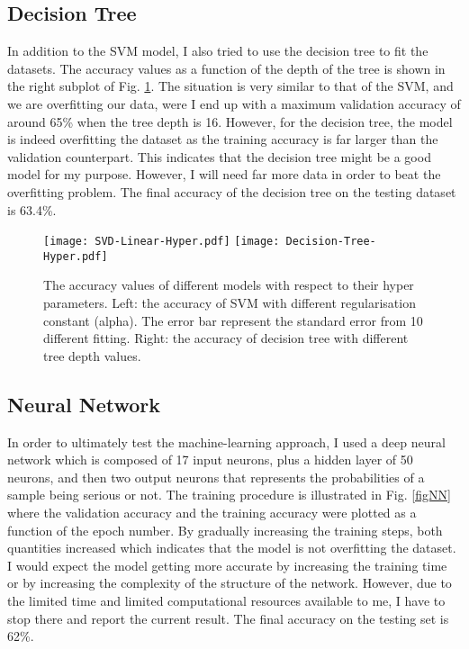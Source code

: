 \documentclass[12pt,a4paper]{article}
\begin{document}
\subsection{Decision Tree}

In addition to the SVM model, I also tried to use the decision tree to fit the datasets. The accuracy values as a function of the depth of the tree is shown in the right subplot of Fig. \ref{figModel}. The situation is very similar to that of the SVM, and we are overfitting our data, were I end up with a maximum validation accuracy of around 65\% when the tree depth is 16. However, for the decision tree, the model is indeed overfitting the dataset as the training accuracy is far larger than the validation counterpart. This indicates that the decision tree might be a good model for my purpose. However, I will need far more data in order to beat the overfitting problem. The final accuracy of the decision tree on the testing dataset is 63.4\%.

\begin{figure}
    \centering
    \texttt{[image: SVD-Linear-Hyper.pdf]}
    \texttt{[image: Decision-Tree-Hyper.pdf]}
    \caption{The accuracy values of different models with respect to their hyper parameters. Left: the accuracy of SVM with different regularisation constant (alpha). The error bar represent the standard error from 10 different fitting. Right: the accuracy of decision tree with different tree depth values.}
    \label{figModel}
\end{figure}

\subsection{Neural Network}

In order to ultimately test the machine-learning approach, I used a deep neural network which is composed of 17 input neurons, plus a hidden layer of 50 neurons, and then two output neurons that represents the probabilities of a sample being serious or not. The training procedure is illustrated in Fig. \ref{figNN} where the validation accuracy and the training accuracy were plotted as a function of the epoch number. By gradually increasing the training steps, both quantities increased which indicates that the model is not overfitting the dataset. I would expect the model getting more accurate by increasing the training time or by increasing the complexity of the structure of the network. However, due to the limited time and limited computational resources available to me, I have to stop there and report the current result. The final accuracy on the testing set is 62\%.
\end{document}
